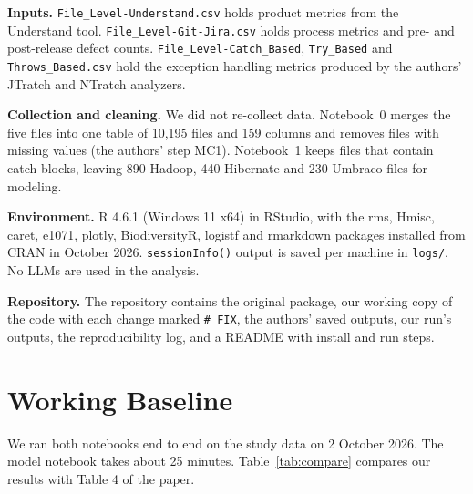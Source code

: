 \documentclass[conference]{IEEEtran}
\begin{document}
\textbf{Inputs.} \texttt{File\_Level-Understand.csv} holds product metrics from the Understand tool. \texttt{File\_Level-Git-Jira.csv} holds process metrics and pre- and post-release defect counts. \texttt{File\_Level-Catch\_Based}, \texttt{Try\_Based} and \texttt{Throws\_Based.csv} hold the exception handling metrics produced by the authors' JTratch and NTratch analyzers.

\textbf{Collection and cleaning.} We did not re-collect data. Notebook~0 merges the five files into one table of 10,195 files and 159 columns and removes files with missing values (the authors' step MC1). Notebook~1 keeps files that contain catch blocks, leaving 890 Hadoop, 440 Hibernate and 230 Umbraco files for modeling.

\textbf{Environment.} R 4.6.1 (Windows 11 x64) in RStudio, with the rms, Hmisc, caret, e1071, plotly, BiodiversityR, logistf and rmarkdown packages installed from CRAN in October 2026. \texttt{sessionInfo()} output is saved per machine in \texttt{logs/}. No LLMs are used in the analysis.

\textbf{Repository.} The repository contains the original package, our working copy of the code with each change marked \texttt{\# FIX}, the authors' saved outputs, our run's outputs, the reproducibility log, and a README with install and run steps.

\section{Working Baseline}
We ran both notebooks end to end on the study data on 2 October 2026. The model notebook takes about 25 minutes. Table~\ref{tab:compare} compares our results with Table 4 of the paper.
\end{document}
